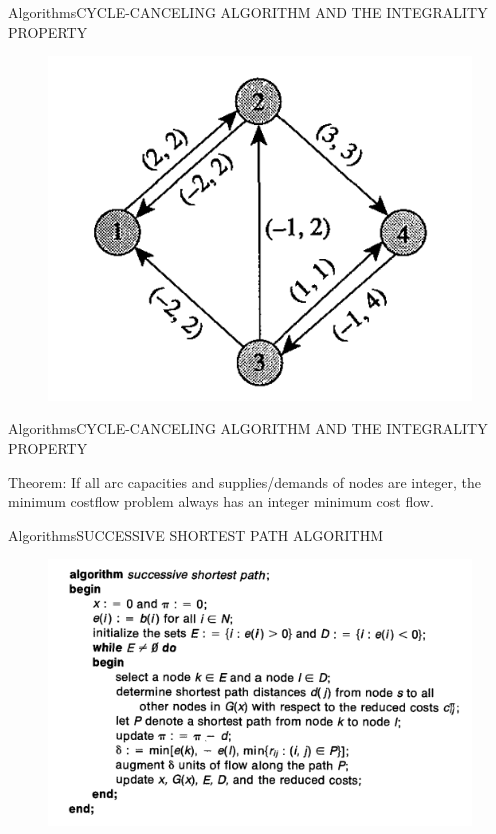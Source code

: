 \documentclass{beamer}
\begin{document}
\begin{frame}{Algorithms}{CYCLE-CANCELING ALGORITHM AND THE
  INTEGRALITY PROPERTY}
  \begin{figure}[h!t]
    \centering
    \includegraphics[scale = 0.4]{figura4canceling.png}
    \end{figure}
\end{frame}

\begin{frame}{Algorithms}{CYCLE-CANCELING ALGORITHM AND THE
  INTEGRALITY PROPERTY}
\begin{block}{Theorem: }
  If all arc capacities and supplies/demands
  of nodes are integer, the minimum costflow problem always has an integer minimum
  cost flow.  
\end{block}
\end{frame}

\begin{frame}{Algorithms}{SUCCESSIVE SHORTEST PATH ALGORITHM}
\begin{figure}[h!t]
\centering
\includegraphics[scale = 0.55 ]{pseudocodigosuccesive.png}
\end{figure}
\end{frame}
\end{document}
